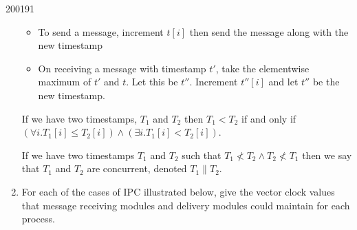 \documentclass[10pt,\jkfside,a4paper]{article}
\begin{document}
\begin{examquestion}{2001}{9}{1}
\begin{enumerate}[label=(\alph*)]
\begin{itemize}
\item To send a message, increment $t[i]$ then send the message along with
the new timestamp

\item On receiving a message with timestamp $t'$, take the elementwise
maximum of $t'$ and $t$. Let this be $t''$. Increment $t''[i]$ and let $t''$
be the new timestamp.

\end{itemize}

If we have two timestamps, $T_1$ and $T_2$ then $T_1 < T_2$ if and only if
$(\forall i. T_1[i] \leq T_2[i]) \wedge (\exists i. T_1[i] < T_2[i])$.

If we have two timestamps $T_1$ and $T_2$ such that $T_1 \not< T_2 \wedge
T_2 \not< T_1$ then we say that $T_1$ and $T_2$ are concurrent, denoted
$T_1 \| T_2$.

\item For each of the cases of IPC illustrated below, give the vector clock
values that message receiving modules and delivery modules could maintain
for each process.

\begin{enumerate}


\end{enumerate}
\end{enumerate}
\end{examquestion}
\end{document}

